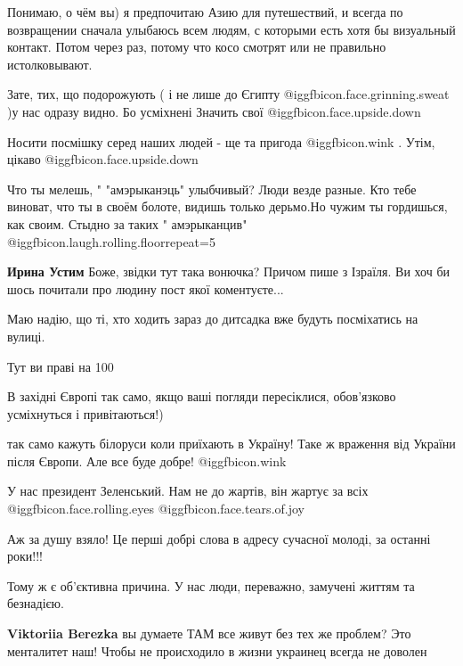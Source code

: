 \begin{itemize}

Понимаю, о чём вы) я предпочитаю Азию для путешествий, и всегда по возвращении
сначала улыбаюсь всем людям, с которыми есть хотя бы визуальный контакт. Потом
через раз, потому что косо смотрят или не правильно истолковывают.



Зате, тих, що подорожують ( і не лише до Єгипту @igg{fbicon.face.grinning.sweat} )у нас одразу видно. Бо усміхнені
Значить свої @igg{fbicon.face.upside.down} 

Носити посмішку серед наших людей - ще та пригода @igg{fbicon.wink} . Утім, цікаво @igg{fbicon.face.upside.down} 

Что ты мелешь, " "амэрыканэць" улыбчивый?
Люди везде разные.
Кто тебе виноват, что ты в своём болоте, видишь только дерьмо.Но чужим ты гордишься, как своим.
Стыдно за таких " амэрыканцив" @igg{fbicon.laugh.rolling.floor}{repeat=5} 

\begin{itemize} %
\textbf{Ирина Устим} Боже, звідки тут така вонючка? Причом пише з Ізраїля. Ви хоч би шось почитали про людину пост якої коментуєте...
\end{itemize} %

Маю надію, що ті, хто ходить зараз до дитсадка вже будуть посміхатись на вулиці.

Тут ви праві на 100%

В західні Європі так само, якщо ваші погляди пересіклися, обов'язково усміхнуться і привітаються!)


так само кажуть білоруси коли приїхають в Україну!
Таке ж враження від України після Європи.
Але все буде добре!  @igg{fbicon.wink} 

У нас президент Зеленський. Нам не до жартів, він жартує за всіх @igg{fbicon.face.rolling.eyes}  @igg{fbicon.face.tears.of.joy} 

Аж за душу взяло! Це перші добрі слова в адресу сучасної молоді, за останні роки!!!

Тому ж є об'єктивна причина. У нас люди, переважно, замучені життям та безнадією.

\begin{itemize} %
\textbf{Viktoriia Berezka} вы думаете ТАМ все живут без тех же проблем? Это менталитет наш! Чтобы не происходило в жизни украинец всегда не доволен


\end{itemize}
\end{itemize}
